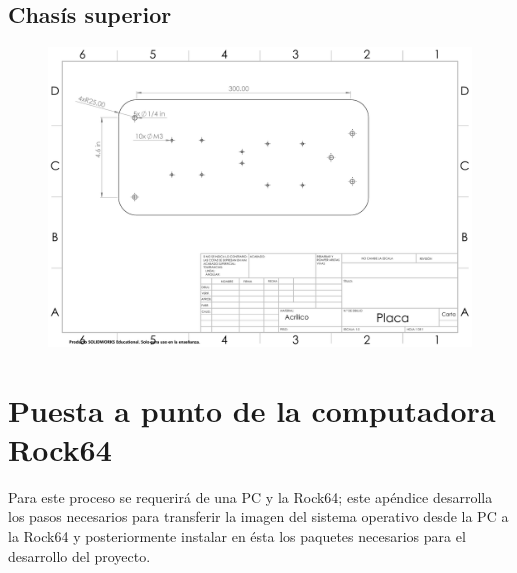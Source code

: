 \documentclass[12pt, letterpaper, oneside]{book}
\begin{document}
	\section{Chasís superior}
	\label{sec:chass}
	\vspace*{-0.5cm}
	\begin{figure}[htbp!]
		\centering
		\includegraphics[width=1.1\textwidth, angle=270]{./Figuras/Placa.PDF}
	\end{figure}
	\chapter{Puesta a punto de la computadora Rock64}
	\label{cap:pap}
	Para este proceso se requerirá de una PC y la Rock64; este apéndice desarrolla los pasos necesarios para transferir la imagen del sistema operativo desde la PC a la Rock64 y posteriormente instalar en ésta los paquetes necesarios para el desarrollo del proyecto.
\end{document}
